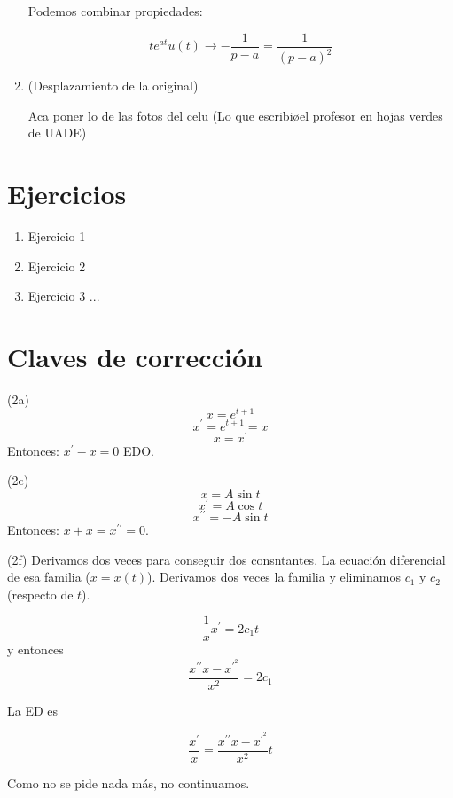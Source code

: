 \begin{enumerate}
Podemos combinar propiedades:

$$
t e^{at} u(t) \longrightarrow -\frac{1}{p-a} = \frac{1}{(p-a)^2}
$$ %

\item (Desplazamiento de la original)

Aca poner lo de las fotos del celu (Lo que escribi\o el profesor en hojas verdes de UADE)

\end{enumerate}

\section{Ejercicios}

\begin{enumerate}

\item Ejercicio 1
\item Ejercicio 2
\item Ejercicio 3 ...

\end{enumerate}

\section{Claves de correcci\'on}

\begin{exercise}
(2a)
$$x = e^{t+1}$$
$$x^{\prime} = e ^{t + 1} = x$$
$$x = x^{\prime}$$
Entonces: $x^{\prime} - x = 0$ EDO.

\end{exercise}

\begin{exercise}
(2c)
$$x = A \sin{t}$$
$$x^{\prime} = A \cos{t}$$
$$x^{\prime \prime} = - A \sin{t}$$
Entonces: $x + x = x^{\prime \prime} = 0$.

\end{exercise}

\begin{exercise}
(2f) Derivamos dos veces para conseguir dos consntantes. La ecuaci\'on diferencial de esa familia ($x = x(t)$).  Derivamos dos veces la familia y eliminamos $c_1$ y $c_2$ (respecto de $t$).

$$
\frac{1}{x}x^{\prime} = 2c_1t
$$
y entonces
$$
\frac{x^{\prime\prime}x - x^{\prime^2}}{x^2} = 2c_1
$$

La ED es

$$
\frac{x^{\prime}}{x} = \frac{x^{\prime\prime}x - x^{\prime^2}}{x^2}t
$$

Como no se pide nada m\'as, no continuamos.

\end{exercise}

